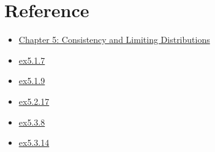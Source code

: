 \section{Reference}
\begin{itemize}
    \item \href{https://www.stat.purdue.edu/~tlzhang/stat517/chapter5_517.pdf}{Chapter 5: Consistency and Limiting Distributions}
    \item \href{https://tomoki-okuno.com/files/math/Ch5_sol.pdf}{ex5.1.7}
    \item \href{https://tomoki-okuno.com/files/math/Ch5_sol.pdf}{ex5.1.9}
    \item \href{https://tomoki-okuno.com/files/math/Ch5_sol.pdf}{ex5.2.17}
    \item \href{https://tomoki-okuno.com/files/math/Ch5_sol.pdf}{ex5.3.8}
    \item \href{https://tomoki-okuno.com/files/math/Ch5_sol.pdf}{ex5.3.14}
\end{itemize}

